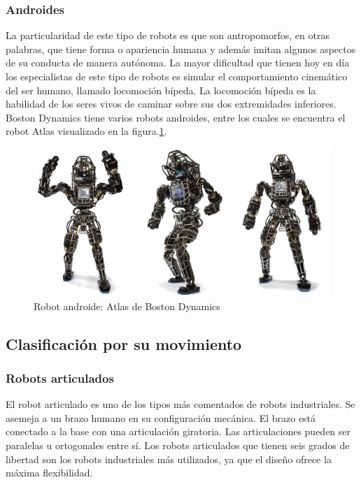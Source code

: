         \subsubsection{Androides}
        La particularidad de este tipo de robots es que son antropomorfos, en otras palabras, que tiene forma o apariencia humana y además imitan algunos aspectos de su conducta de manera autónoma. La mayor dificultad que tienen hoy en día los especialistas de este tipo de robots es simular el comportamiento cinemático del ser humano, llamado locomoción bípeda. La locomoción bípeda es la habilidad de los seres vivos de caminar sobre sus dos extremidades inferiores. Boston Dynamics tiene varios robots androides, entre los cuales se encuentra el robot Atlas visualizado en la figura.\ref{f:Cap2_general_9}.
        
        \begin{figure}[htb]
            \centering
            \includegraphics[width=0.65\linewidth]{Main/Chapter2/Images2/Robot-androide.png}
            \caption{Robot androide: Atlas de Boston Dynamics \cite{cap2_androide}}
            \label{f:Cap2_general_9}
        \end{figure}
        
        \newpage

    
    \subsection{Clasificación por su movimiento}
    
        \subsubsection{Robots articulados}
        
        El robot articulado es uno de los tipos más comentados de robots industriales. Se asemeja a un brazo humano en su configuración mecánica. El brazo está conectado a la base con una articulación giratoria. Las articulaciones pueden ser paralelas u ortogonales entre sí. Los robots articulados que tienen seis grados de libertad son los robots industriales más utilizados, ya que el diseño ofrece la máxima flexibilidad.
        
